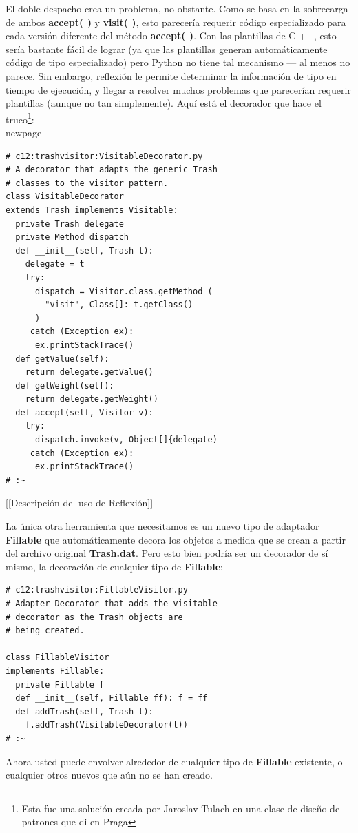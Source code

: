 \documentclass{article}
\begin{document}
El doble despacho crea un problema, no obstante. Como se basa en la sobrecarga de ambos \textbf{accept( )} y \textbf{visit( )}, esto parecería requerir código especializado para cada versión diferente del método \textbf{accept( )}. Con las plantillas de C ++, esto sería bastante fácil de lograr (ya que las plantillas generan automáticamente código de tipo especializado) pero Python no tiene tal mecanismo — al menos no parece. Sin embargo, reflexión le permite determinar la información de tipo en tiempo de ejecución, y llegar a resolver muchos problemas que parecerían requerir plantillas (aunque no tan simplemente). Aquí está el decorador que hace el truco\footnote{Esta fue una solución creada por Jaroslav Tulach en una clase de diseño de patrones que di en Praga}:       \\newpage

\begin{lstlisting} 
# c12:trashvisitor:VisitableDecorator.py 
# A decorator that adapts the generic Trash 
# classes to the visitor pattern. 
class VisitableDecorator 
extends Trash implements Visitable: 
  private Trash delegate 
  private Method dispatch 
  def __init__(self, Trash t): 
    delegate = t 
    try: 
      dispatch = Visitor.class.getMethod ( 
        "visit", Class[]: t.getClass()  
      ) 
     catch (Exception ex): 
      ex.printStackTrace() 
  def getValue(self): 
    return delegate.getValue() 
  def getWeight(self): 
    return delegate.getWeight() 
  def accept(self, Visitor v): 
    try: 
      dispatch.invoke(v, Object[]{delegate) 
     catch (Exception ex): 
      ex.printStackTrace() 
# :~ 
\end{lstlisting}

[[Descripción del uso de Reflexión]]  \newline

La única otra herramienta que necesitamos es un nuevo tipo de adaptador \textbf{Fillable} que automáticamente decora los objetos a medida que se crean a partir del archivo original \textbf{Trash.dat}. Pero esto bien podría ser un decorador de sí mismo, la decoración de cualquier tipo de \textbf{Fillable}:        \newline

\begin{lstlisting} 
# c12:trashvisitor:FillableVisitor.py  
# Adapter Decorator that adds the visitable  
# decorator as the Trash objects are  
# being created. 

class FillableVisitor 
implements Fillable: 
  private Fillable f 
  def __init__(self, Fillable ff): f = ff  
  def addTrash(self, Trash t): 
    f.addTrash(VisitableDecorator(t)) 
# :~ 
\end{lstlisting}
Ahora usted puede envolver alrededor de cualquier tipo de \textbf{Fillable} existente,  o cualquier otros nuevos que aún no se han creado. \newline
\end{document}
